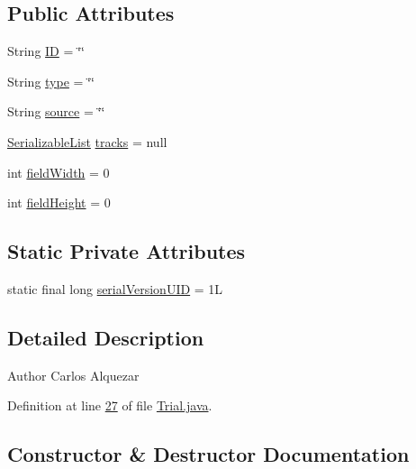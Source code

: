 \subsection*{Public Attributes}
\begin{DoxyCompactItemize}
\item 
String \hyperlink{classdata_1_1_trial_a317298c3409575f71e43acd3f73ce295}{ID} = \char`\"{}\char`\"{}
\item 
String \hyperlink{classdata_1_1_trial_a0b86e44425dbe3c9d866aa273f87828a}{type} = \char`\"{}\char`\"{}
\item 
String \hyperlink{classdata_1_1_trial_a00baeba9d13a88ce01098a02d1e570d5}{source} = \char`\"{}\char`\"{}
\item 
\hyperlink{classdata_1_1_serializable_list}{Serializable\+List} \hyperlink{classdata_1_1_trial_ab0c3156759c41236f7f0bc83e1e5ef8f}{tracks} = null
\item 
int \hyperlink{classdata_1_1_trial_abce721f4aa25ad8ba8181de990a78b73}{field\+Width} = 0
\item 
int \hyperlink{classdata_1_1_trial_ab4aa79eade248fcf045b32ff9f11ca8b}{field\+Height} = 0
\end{DoxyCompactItemize}
\subsection*{Static Private Attributes}
\begin{DoxyCompactItemize}
\item 
static final long \hyperlink{classdata_1_1_trial_a3238d314ecdee14d2966760945d00c3b}{serial\+Version\+U\+ID} = 1L
\end{DoxyCompactItemize}


\subsection{Detailed Description}
\begin{DoxyAuthor}{Author}
Carlos Alquezar 
\end{DoxyAuthor}


Definition at line \hyperlink{_trial_8java_source_l00027}{27} of file \hyperlink{_trial_8java_source}{Trial.\+java}.



\subsection{Constructor \& Destructor Documentation}
\hypertarget{classdata_1_1_trial_a51be9587f5b14a496bb780bccbccaee8}{}\label{classdata_1_1_trial_a51be9587f5b14a496bb780bccbccaee8} 
